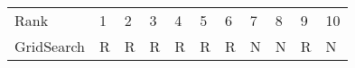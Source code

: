 \begin{tabular}{lllllllllll}
Rank & 1 & 2 & 3 & 4 & 5 & 6 & 7 & 8 & 9 & 10 \\
GridSearch & R & R & R & R & R & R & N & N & R & N \\
\end{tabular}
